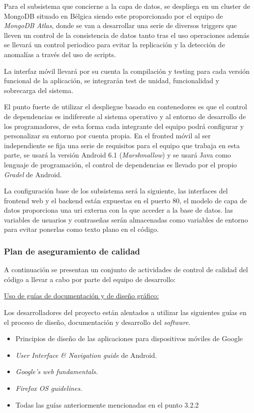 \documentclass{article}
\begin{document}
Para el subsistema que concierne a la capa de datos, se despliega en un cluster de MongoDB situado en 
Bélgica siendo este proporcionado por el equipo de \textit{MongoDB Atlas}, donde se van a desarrollar una 
serie de diversos triggers que lleven un control de la consistencia de datos tanto tras el uso operaciones 
además se llevará un control periodico para evitar la replicación y la detección de anomalías a través del uso de scripts.

La interfaz móvil llevará por su cuenta la compilación y testing para cada versión funcional de la aplicación, 
se integrarán test de unidad, funcionalidad y sobrecarga del sistema.

El punto fuerte de utilizar el despliegue basado en contenedores es que el control de dependencias es 
indiferente al sistema operativo y al entorno de desarrollo de los programadores, de esta forma cada integrante del 
equipo podrá configurar y personalizar su entorno por cuenta propia. 
En el fronted móvil al ser independiente se fija una serie de requisitos para el equipo que trabaja en esta parte, 
se usará la versión Android 6.1 (\textit{Marshmallow}) y se usará Java como lenguaje de programación, el control de 
dependencias es llevado por el propio \textit{Gradel} de Android.

La configuración base de los subsistema será la siguiente, las interfaces del frontend web y el backend están 
expuestas en el puerto 80, el modelo de capa de datos proporciona una uri externa con la que acceder a la base de 
datos. las variables de usuarios y contraseñas serán almacenadas como variables de entorno para evitar ponerlas como 
texto plano en el código.

\subsubsection{Plan de aseguramiento de calidad}

A continuación se presentan un conjunto de actividades de control de calidad del código a llevar a cabo por parte 
del equipo de desarrollo:

\underline{Uso de guías de documentación y de diseño gráfico:}

Los desarrolladores del proyecto están alentados a utilizar las siguientes guías en el proceso de diseño, 
documentación y desarrollo del \textit{software}.

\begin{itemize} %
    \item Principios de diseño de las aplicaciones para dispositivos móviles de Google
    \item \textit{User Interface \& Navigation guide} de Android.
    \item \textit{Google's web fundamentals.}
    \item \textit{Firefox OS guidelines.}
    \item Todas las guías anteriormente mencionadas en el punto 3.2.2
\end{itemize}
\end{document}
